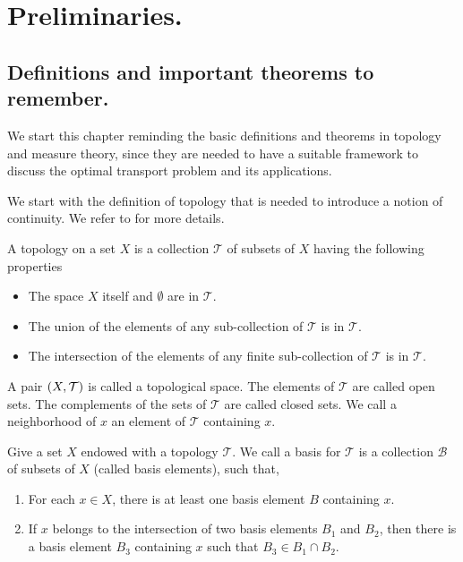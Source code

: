 \chapter{Preliminaries.}
\section{Definitions and important theorems to remember.}

We start this chapter reminding the basic definitions and theorems in topology and measure theory, since they are needed to have a suitable framework to discuss the optimal transport problem and its applications. 

We start with the definition of topology that is needed to introduce a notion of continuity. We refer to \cite{munkres2000topology} for more details.

\begin{definition}[Topology]
	A topology on a set $X$ is a collection $\mathcal T$ of subsets of $X$ having the following properties
	\begin{itemize}
		\item  The space $X$ itself and $\emptyset$ are in $\mathcal T$.
		\item  The union of the elements of any sub-collection of $\mathcal T$ is in $\mathcal T$.
		\item The intersection of the elements of any finite sub-collection of $\mathcal T$ is in $\mathcal T$.
	\end{itemize}
\end{definition}

A pair $\left( X, \mathcal{T} \right)$ is called a topological space. The elements of $\mathcal T$ are called open sets. The complements of the sets of $\mathcal T$ are called closed sets. We call a neighborhood of $x$ an element of $\mathcal{T}$ containing $x$.

\begin{definition}
	Give a set $X$ endowed with a topology $\mathcal T$. We call a basis for $\mathcal{T}$ is a collection $\mathcal{B}$ of subsets of $X$ (called basis elements), such that,
	\begin{enumerate}
		\item  For each $x\in X$, there is at least one basis element $B$ containing $x$. 
		\item  If $x$ belongs to the intersection of two basis elements $B_1$ and $B_2$, then there is a basis element $B_3$ containing $x$ such that $B_3 \in B_1 \cap B_2$. 
	\end{enumerate}
\end{definition}

